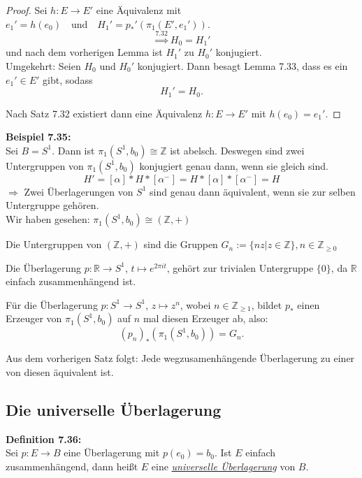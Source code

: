 \documentclass[fleqn, 12pt, letterpaper]{article}
\begin{document}
\begin{proof}
Sei \( h : E \to E' \) eine Äquivalenz mit \( e_1'=h(e_0) \quad \text{und} \quad H_1'= p_*'(\pi_1(E',e_1')) \). 
\[
\overset{7.32}{\Rightarrow} H_0 = H_1'
\]
und nach dem vorherigen Lemma ist \( H_1' \) zu \( H_0' \) konjugiert.\\

Umgekehrt: Seien \( H_0 \) und \( H_0' \) konjugiert. Dann besagt {Lemma 7.33}, dass es ein \( e_1' \in E' \) gibt, sodass
\[
H_1' = H_0.
\]

Nach {Satz 7.32} existiert dann eine Äquivalenz \( h : E \to E' \) mit \( h(e_0) = e_1' \).
\end{proof}

\textbf{Beispiel 7.35:} \\
Sei \( B = S^1 \). Dann ist \( \pi_1(S^1, b_0) \cong \mathbb{Z} \) ist abelsch. Deswegen sind zwei Untergruppen von \( \pi_1(S^1, b_0) \) konjugiert genau dann, wenn sie gleich sind. 
\[H'=[\alpha]*H*[\alpha^{-}]=H*[\alpha]*[\alpha^{-}]=H\]
\(\Rightarrow\) Zwei Überlagerungen von \( S^1 \) sind genau dann äquivalent, wenn sie zur selben Untergruppe gehören.\\

Wir haben gesehen: $\pi_1(S^1,b_0)\cong(\mathbb{Z},+)$

Die Untergruppen von \( (\mathbb{Z},+) \) sind die Gruppen $G_n:= \{nz|z\in\mathbb{Z}\},n\in\mathbb{Z}_{\geq0}$

Die Überlagerung \( p : \mathbb{R} \to S^1 \), \( t \mapsto e^{2\pi i t} \), gehört zur trivialen Untergruppe \( \{0\} \), da \( \mathbb{R} \) einfach zusammenhängend ist.

Für die Überlagerung \( p : S^1 \to S^1 \), \( z \mapsto z^n \), wobei \( n \in \mathbb{Z}_{\geq 1} \), bildet \( p_* \) einen Erzeuger von \( \pi_1(S^1, b_0)  \) auf \( n \) mal diesen Erzeuger ab, also:
\[
(p_n)_*\left( \pi_1(S^1, b_0) \right) = G_n.
\]

Aus dem vorherigen Satz folgt: Jede wegzusamenhängende Überlagerung zu einer von diesen äquivalent ist.

\subsection{Die universelle Überlagerung}

\textbf{Definition 7.36:} \\
Sei \( p : E \to B \) eine Überlagerung mit \( p(e_0) = b_0 \). Ist \( E \) einfach zusammenhängend, dann heißt \( E \) eine \emph{\underline{universelle Überlagerung}} von \( B \).\\
\end{document}
